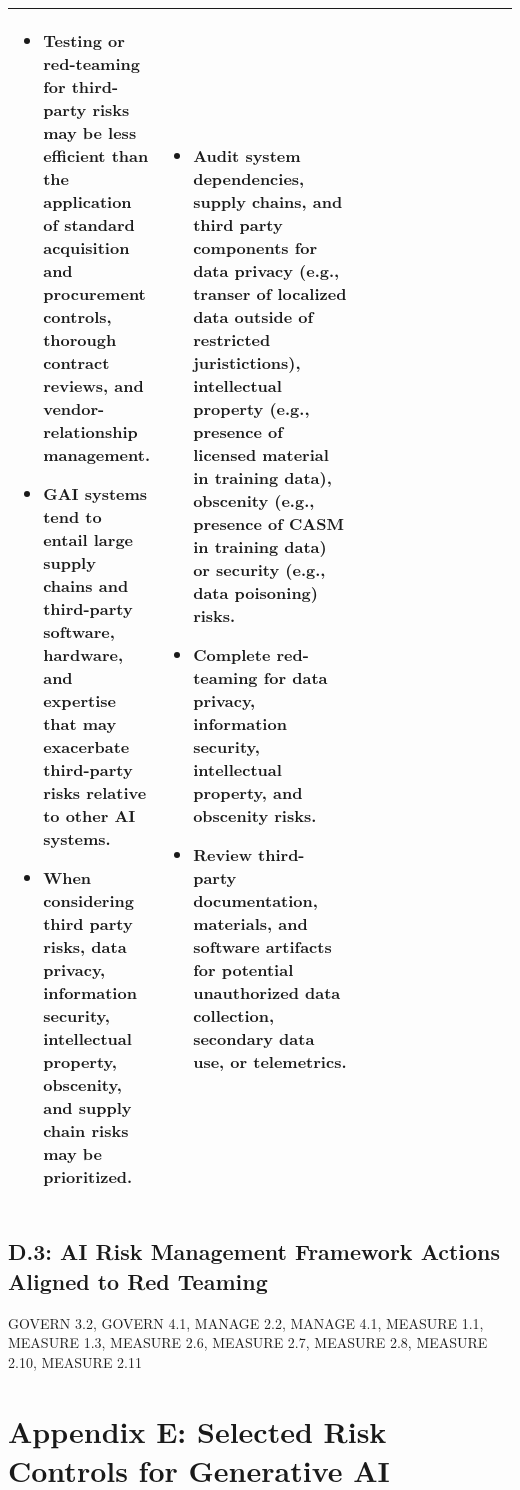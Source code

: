 \documentclass[fleqn]{article}
\begin{document}
\begin{table}[H]
\begin{tabular}{|m{0.25\linewidth} |m{0.40\linewidth} | m{0.35\linewidth} |}
		\begin{itemize}[noitemsep, leftmargin=*] 
			\item Testing or red-teaming for third-party risks may be less efficient than the application of standard acquisition and procurement controls, thorough contract reviews, and vendor-relationship management.
			\item GAI systems tend to entail large supply chains and third-party software, hardware, and expertise that may exacerbate third-party risks relative to other AI systems. 
			\item When considering third party risks, data privacy, information security, intellectual property, obscenity, and supply chain risks may be prioritized.
		\end{itemize} 
		& 
		\begin{itemize}[noitemsep, leftmargin=*] 
			\item Audit system dependencies, supply chains, and third party components for data privacy (e.g., transer of localized data outside of restricted juristictions), intellectual property (e.g., presence of licensed material in training data), obscenity (e.g., presence of CASM in training data) or security (e.g., data poisoning) risks.
			\item Complete red-teaming for data privacy, information security, intellectual property, and obscenity risks.
			\item Review third-party documentation, materials, and software artifacts for potential unauthorized data collection, secondary data use, or telemetrics.
		\end{itemize} \\
		\hline
	\end{tabular}
\end{table}

\subsection*{D.3: AI Risk Management Framework Actions Aligned to Red Teaming}\label{sec:appndxd3}

GOVERN 3.2, GOVERN 4.1, MANAGE 2.2, MANAGE 4.1, MEASURE 1.1, MEASURE 1.3, MEASURE 2.6, MEASURE 2.7, MEASURE 2.8, MEASURE 2.10, MEASURE 2.11

\pagebreak

\section*{Appendix E: Selected Risk Controls for Generative AI}\label{sec:appndxe}
\end{document}
